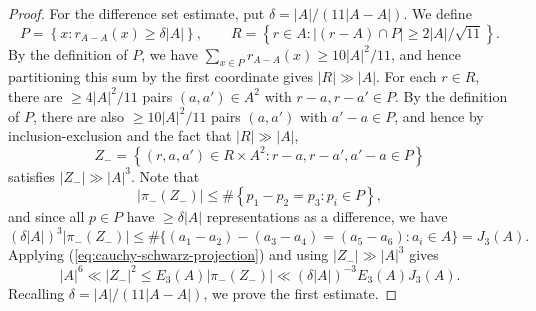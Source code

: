 \documentclass[10pt,a4paper]{amsart}
\newcommand{\de}{\delta}
\begin{document}
\begin{proof}
    For the difference set estimate, put \(\delta = \left\lvert A \right\rvert / (11 \left\lvert A-A \right\rvert )\). We define
    \[
    P = \left\{ x : r_{A-A} (x) \geq \delta \left\lvert A \right\rvert  \right\} , \qquad R = \left\{ r \in A : \left\lvert \left( r-A \right) \cap P \right\rvert  \geq 2 \left\lvert A \right\rvert / \sqrt{11} \right\} 
    .\]
    By the definition of \(P\), we have \(\sum _{x \in P} r_{A-A} (x) \geq 10 \left\lvert A \right\rvert ^{2} / 11\), and hence partitioning this sum by the first coordinate gives \(\left\lvert R \right\rvert \gg \left\lvert A \right\rvert \). 
    For each \(r \in R\), there are \(\geq 4 \left\lvert A \right\rvert ^{2} / 11\) pairs \((a,a') \in A ^{2}\) with \(r-a,r-a' \in P\). 
    By the definition of \(P\), there are also \(\geq 10 \left\lvert A \right\rvert ^{2} / 11\) pairs \((a,a')\) with \(a'-a \in P\), and hence by inclusion-exclusion and the fact that \(|R| \gg |A|\),
    \[
    Z_{-}  = \left\{ (r,a,a') \in R \times  A^{2} : r-a,r-a',a'-a \in P \right\} 
    \]
    satisfies \(\left\lvert Z_{-}  \right\rvert \gg \left\lvert A \right\rvert ^{3} \). 
    Note that 
    \[
    \left\lvert \pi_{-} (Z_{-} ) \right\rvert \leq \# \left\{ p_1 - p_2 = p_3 : p_{i} \in P \right\} 
    ,\]
    and since all \(p \in P\) have \(\geq \delta \left\lvert A \right\rvert \) representations as a difference, we have
    \[
    \left( \delta \left\lvert A \right\rvert  \right) ^{3}  \left\lvert \pi_{-} (Z_{-} ) \right\rvert \leq  \# \{ (a_1 - a_2) - (a_3 - a_4) = (a_5 - a_6) : a_i \in A  \}= J_3(A)
    .\]
    Applying (\ref{eq:cauchy-schwarz-projection}) and using \(|Z_-| \gg |A|^3\) gives
    \[
    \left\lvert A \right\rvert ^{6} \ll \left\lvert Z_{-}  \right\rvert ^{2} \leq E_3(A) \left\lvert \pi_{-} (Z_{-} ) \right\rvert \ll \left( \delta \left\lvert A \right\rvert \right) ^{-3 } E_3(A) J_3(A).
    \]
    Recalling \(\de = |A| / (11 |A-A| )\), we prove the first estimate.
    

\end{proof}
\end{document}

